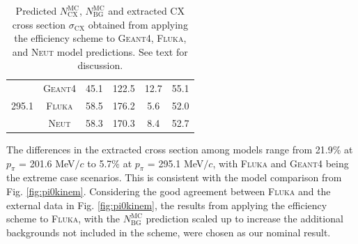 \begin{table}[htbp]
\begin{center}
\begin{tabular}{c|c|c|c|c|c}
\multirow{4}{*}{295.1} %
& \textsc{Geant4} & 45.1 & 122.5 & 12.7 & 55.1 \\
& \textsc{Fluka} & 58.5 & 176.2 & 5.6 & 52.0 \\
& \textsc{Neut} & 58.3 & 170.3 & 8.4 & 52.7 \\ \hline
\end{tabular}
\caption{Predicted $N_{\mathrm{CX}}^{\mathrm{MC}}$, $N_{\mathrm{BG}}^{\mathrm{MC}}$ and extracted CX cross section $\sigma_{\mathrm{CX}}$ obtained from applying the efficiency scheme to \textsc{Geant4}, \textsc{Fluka}, and \textsc{Neut} model predictions. See text for discussion.}
\label{tbl:eff_scheme_results}
\end{center}
\end{table}

The differences in the extracted cross section among models range from 21.9\% at $p_{\pi}$ = 201.6 MeV$/c$ to 5.7\% at $p_{\pi}$ = 295.1 MeV$/c$, with \textsc{Fluka} and \textsc{Geant4} being the extreme case scenarios. This is consistent with the model comparison from Fig. \ref{fig:pi0kinem}. Considering the good agreement between \textsc{Fluka} and the external data in Fig. \ref{fig:pi0kinem}, the results from applying the efficiency scheme to \textsc{Fluka}, with the $N_{\mathrm{BG}}^{\mathrm{MC}}$ prediction scaled up to increase the additional backgrounds not included in the scheme, were chosen as our nominal result.